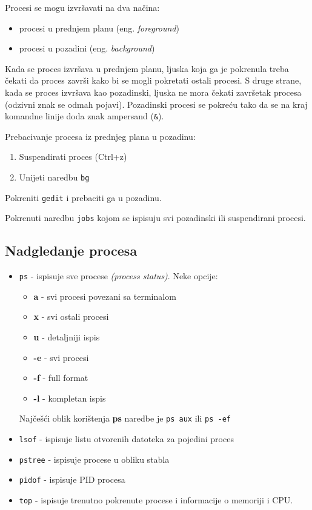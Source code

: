 Procesi se mogu izvršavati na dva načina:
\begin{itemize}
	\item procesi u prednjem planu (eng. \textit{foreground})
	\item procesi u pozadini (eng. \textit{background})
\end{itemize}
Kada se proces izvršava u prednjem planu, ljuska koja ga je pokrenula treba čekati da proces završi kako bi se mogli pokretati ostali procesi. S druge strane, kada se proces izvršava kao pozadinski, ljuska ne mora čekati završetak procesa (odzivni znak se odmah pojavi). Pozadinski procesi se pokreću tako da se na kraj komandne linije doda znak ampersand (\texttt{\&}).

Prebacivanje procesa iz prednjeg plana u pozadinu:
\begin{enumerate}
 \item Suspendirati proces (Ctrl+z)
 \item Unijeti naredbu \texttt{bg}
\end{enumerate}

\begin{zadatak}
	Pokreniti \texttt{gedit} i prebaciti ga u pozadinu.
\end{zadatak}

\begin{zadatak}
	Pokrenuti naredbu \texttt{jobs} kojom se ispisuju svi pozadinski ili suspendirani procesi.
\end{zadatak}

\subsection*{Nadgledanje procesa}
\begin{itemize}
 \item \texttt{ps} - ispisuje sve procese \textit{(process status)}. Neke opcije: 
\begin{itemize}
 \item \textbf{a} - svi procesi povezani sa terminalom
 \item \textbf{x} - svi ostali procesi
 \item \textbf{u} - detaljniji ispis
 \item \textbf{-e} - svi procesi
 \item \textbf{-f} - full format
 \item \textbf{-l} - kompletan ispis
\end{itemize}
Najčešći oblik korištenja \textbf{ps} naredbe je \texttt{ps aux} ili \texttt{ps -ef}

 \item \texttt{lsof} - ispisuje listu otvorenih datoteka za pojedini proces
\item \texttt{pstree} - ispisuje procese u obliku stabla 
\item \texttt{pidof} - ispisuje PID procesa
\item \texttt{top} - ispisuje trenutno pokrenute procese i informacije o memoriji i CPU.
\end{itemize}

